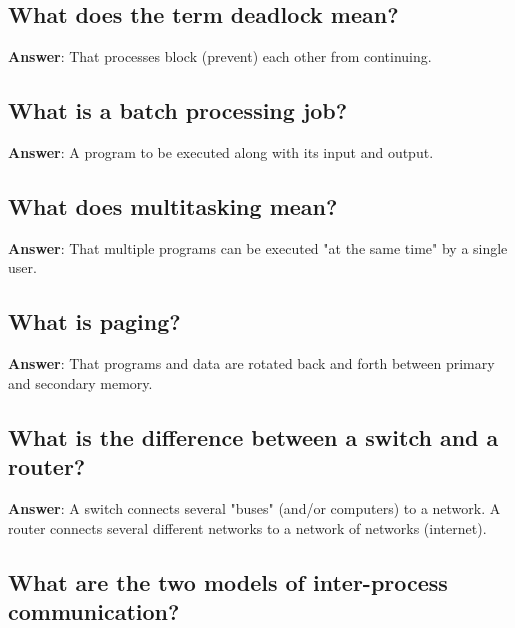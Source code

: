\documentclass[a4paper,11pt,oneside]{article}
\begin{document}
\begin{sloppypar}
\subsection{What does the term deadlock mean?}

\label{q:129:sa:en:True}

\textbf{Answer}: That processes block (prevent) each other from continuing.



\subsection{What is a batch processing job?}

\label{q:130:sa:en:True}

\textbf{Answer}: A program to be executed along with its input and output.



\subsection{What does multitasking mean?}

\label{q:132:sa:en:True}

\textbf{Answer}: That multiple programs can be executed "at the same time" by a single user.



\subsection{What is paging?}

\label{q:133:sa:en:True}

\textbf{Answer}: That programs and data are rotated back and forth between primary and secondary memory.



\subsection{What is the difference between a switch and a router?}

\label{q:134:sa:en:True}

\textbf{Answer}: A switch connects several "buses" (and/or computers) to a network. A router connects several different networks to a network of networks (internet).



\subsection{What are the two models of inter-process communication?}


\end{sloppypar}
\end{document}
